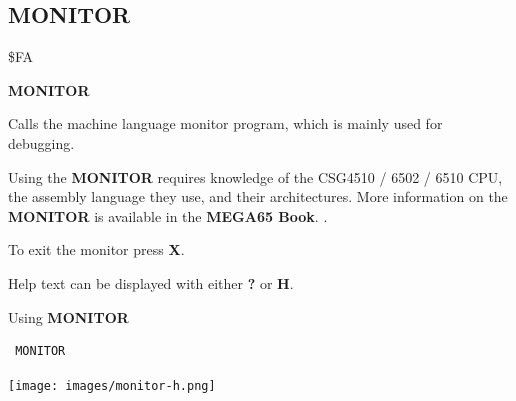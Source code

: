 
\newpage
\subsection{MONITOR}
\begin{description}[leftmargin=2cm,style=nextline]
\item [Token:] \$FA
\item [Format:] {\bf MONITOR}
\item [Usage:]  Calls the machine language
                monitor program, which is mainly used for
                debugging.

\item [Remarks:] Using the {\bf MONITOR} requires knowledge
                 of the CSG4510 / 6502 / 6510 CPU,
                 the assembly language they use, and their
                 architectures. More information on the
                 {\bf MONITOR} is available in
\ifdefined\printmanual
the {\bf MEGA65 Book}.
\else
{}.
\fi

                 To exit the monitor press {\bf X}.

                 Help text can be displayed with either {\bf ?} or {\bf H}.

\item [Example:] Using {\bf MONITOR}
\begin{tcolorbox}[colback=black,coltext=white]
\verbatimfont{\codefont}
\begin{verbatim}
 MONITOR
\end{verbatim}
\end{tcolorbox}
\item \begin{center}\texttt{[image: images/monitor-h.png]}\end{center}
\end{description}


\newpage
